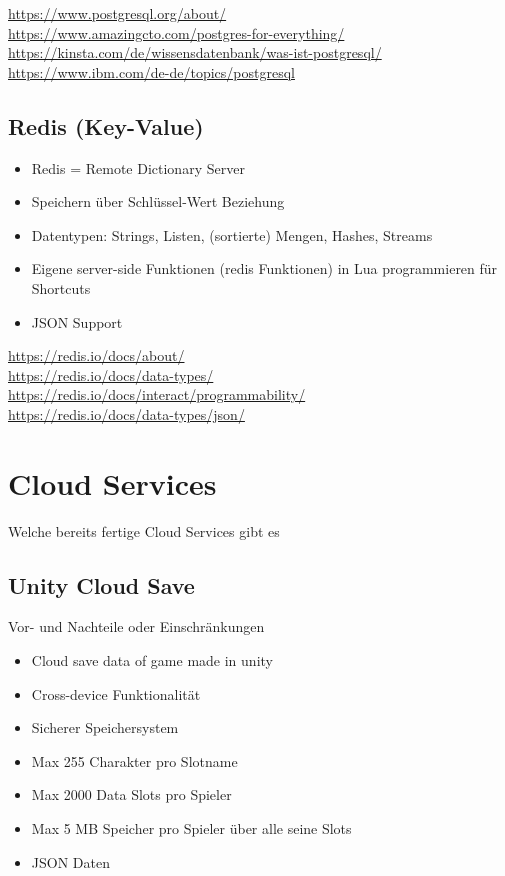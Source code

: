 \url{https://www.postgresql.org/about/}\\
\url{https://www.amazingcto.com/postgres-for-everything/}\\
\url{https://kinsta.com/de/wissensdatenbank/was-ist-postgresql/}\\
\url{https://www.ibm.com/de-de/topics/postgresql}


\subsection{Redis (Key-Value)}

\begin{itemize}
    \item Redis = Remote Dictionary Server
    \item Speichern über Schlüssel-Wert Beziehung
    \item Datentypen: Strings, Listen, (sortierte) Mengen, Hashes, Streams
    \item Eigene server-side Funktionen (redis Funktionen) in Lua programmieren für Shortcuts
    \item JSON Support
\end{itemize}

\url{https://redis.io/docs/about/}\\
\url{https://redis.io/docs/data-types/}\\
\url{https://redis.io/docs/interact/programmability/}\\
\url{https://redis.io/docs/data-types/json/}

\section{Cloud Services}
Welche bereits fertige Cloud Services gibt es

\subsection{Unity Cloud Save} 
Vor- und Nachteile oder Einschränkungen\\

\begin{itemize}
    \item Cloud save data of game made in unity
    \item Cross-device Funktionalität
    \item Sicherer Speichersystem
    \item Max 255 Charakter pro Slotname
    \item Max 2000 Data Slots pro Spieler
    \item Max 5 MB Speicher pro Spieler über alle seine Slots
    \item JSON Daten
\end{itemize}

